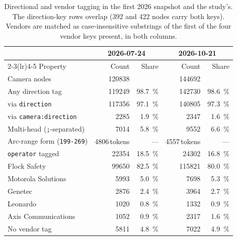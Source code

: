 \documentclass[11pt,twoside]{article}
\begin{document}
\begin{table}[tbp]
\centering
\small
\caption{Directional and vendor tagging in the first 2026 snapshot and the study's. The
direction-key rows overlap (392 and 422 nodes carry both keys). Vendors are matched as
case-insensitive substrings of the first of the four vendor keys present, in both columns.}
\label{tab:tags}
\begin{tabular}{lrrrr}
\toprule
& \multicolumn{2}{c}{2026-07-24} & \multicolumn{2}{c}{2026-10-21} \\
\cmidrule(lr){2-3}\cmidrule(lr){4-5}
Property & Count & Share & Count & Share \\
\midrule
Camera nodes                        & \num{120838} &                     & \num{144692} & \\
Any direction tag                   & \num{119249} & \SI{98.7}{\percent} & \num{142730} & \SI{98.6}{\percent} \\
\quad via \texttt{direction}        & \num{117356} & \SI{97.1}{\percent} & \num{140805} & \SI{97.3}{\percent} \\
\quad via \texttt{camera:direction} & \num{2285}   & \SI{1.9}{\percent}  & \num{2347}   & \SI{1.6}{\percent} \\
Multi-head (\texttt{;}-separated)   & \num{7014}   & \SI{5.8}{\percent}  & \num{9552}   & \SI{6.6}{\percent} \\
Arc-range form (\texttt{199-269})   & \num{4806}\,tokens & ---           & \num{4557}\,tokens & --- \\
\texttt{operator} tagged            & \num{22354}  & \SI{18.5}{\percent} & \num{24302}  & \SI{16.8}{\percent} \\
\midrule
Flock Safety                        & \num{99650}  & \SI{82.5}{\percent} & \num{115821} & \SI{80.0}{\percent} \\
Motorola Solutions                  & \num{5993}   & \SI{5.0}{\percent}  & \num{7698}   & \SI{5.3}{\percent} \\
Genetec                             & \num{2876}   & \SI{2.4}{\percent}  & \num{3964}   & \SI{2.7}{\percent} \\
Leonardo                            & \num{1020}   & \SI{0.8}{\percent}  & \num{1332}   & \SI{0.9}{\percent} \\
Axis Communications                 & \num{1052}   & \SI{0.9}{\percent}  & \num{2317}   & \SI{1.6}{\percent} \\
No vendor tag                       & \num{5811}   & \SI{4.8}{\percent}  & \num{7022}   & \SI{4.9}{\percent} \\
\bottomrule
\end{tabular}
\end{table}
\end{document}
